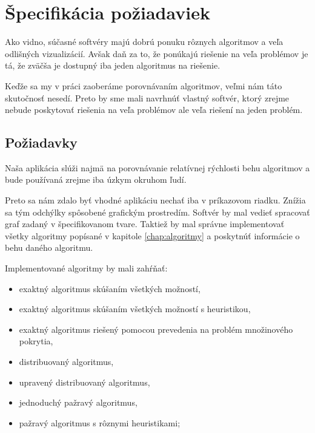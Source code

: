 \clearpage

\section{Špecifikácia požiadaviek}

Ako vidno, súčasné softvéry majú dobrú ponuku rôznych algoritmov a veľa 
odlišných vizualizácií. Avšak daň za to, že ponúkajú riešenie na veľa problémov 
je tá, že zväčša je dostupný iba jeden algoritmus na riešenie.

Keďže sa my v práci zaoberáme porovnávaním algoritmov, veľmi nám táto 
skutočnosť nesedí. Preto by sme mali navrhnúť vlastný softvér, ktorý zrejme 
nebude poskytovať riešenia na veľa problémov ale veľa riešení na jeden problém.


\subsection{Požiadavky}

Naša aplikácia slúži najmä na porovnávanie relatívnej rýchlosti behu algoritmov 
a bude používaná zrejme iba úzkym okruhom ľudí.

Preto sa nám zdalo byť vhodné aplikáciu nechať iba v príkazovom riadku. Znížia 
sa tým odchýlky spôsobené grafickým prostredím. Softvér by mal vedieť spracovať 
graf zadaný v špecifikovanom tvare. Taktiež by mal správne 
implementovať všetky algoritmy popísané v kapitole \ref{chap:algoritmy} a 
poskytnúť informácie o behu daného algoritmu.

Implementované algoritmy by mali zahŕňať:

\begin{itemize}
	\item exaktný algoritmus skúšaním všetkých možností,
	\item exaktný algoritmus skúšaním všetkých možností s heuristikou,
	\item exaktný algoritmus riešený pomocou prevedenia na problém množinového 
		pokrytia,
	\item distribuovaný algoritmus,
	\item upravený distribuovaný algoritmus,
	\item jednoduchý pažravý algoritmus,
	\item pažravý algoritmus s rôznymi heuristikami;
\end{itemize}


